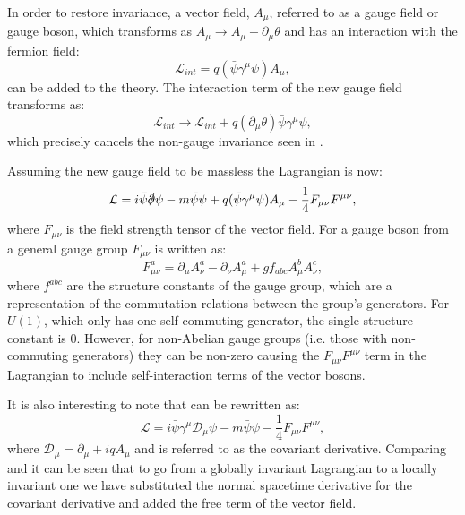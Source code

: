 In order to restore invariance, a vector field, $A_{\mu}$, referred to as a gauge field or gauge boson, which transforms as $A_{\mu}\rightarrow A_{\mu}+\partial_{\mu}\theta$ and has an interaction with the fermion field:
\begin{equation}
  \mathcal{L}_{int}=q(\bar{\psi}\gamma^{\mu}\psi) A_{\mu},
\end{equation}
 can be added to the theory. The interaction term of the new gauge field transforms as:
\begin{equation}
  \mathcal{L}_{int}\rightarrow \mathcal{L}_{int}+q(\partial_{\mu}\theta)\bar{\psi}\gamma^{\mu}\psi,
\end{equation}
which precisely cancels the non-gauge invariance seen in .

Assuming the new gauge field to be massless the Lagrangian is now:
\begin{equation}
  \label{eq:diraclag}
  \mathcal{L}=i\bar{\psi}\slashed{\partial}\psi-m\bar{\psi}\psi+q(\bar{\psi}\gamma^{\mu}\psi) A_{\mu}-\frac{1}{4}F_{\mu\nu}F^{\mu\nu},
\end{equation}
where $F_{\mu\nu}$ is the field strength tensor of the vector field. For a gauge boson from a general gauge group $F_{\mu\nu}$ is written as:
\begin{equation}
F_{\mu\nu}^a=\partial_{\mu}A_{\nu}^a-\partial_{\nu}A_{\mu}^a+gf_{abc}A_{\mu}^{b}A_{\nu}^{c},
\end{equation}
where $f^{abc}$ are the structure constants of the gauge group, which are a representation of the commutation relations between the group's generators. For $U(1)$, which only has one self-commuting generator, the single structure constant is 0. However, for non-Abelian gauge groups (i.e. those with non-commuting generators) they can be non-zero causing the $F_{\mu\nu}F^{\mu\nu}$ term in the Lagrangian to include self-interaction terms of the vector bosons.

It is also interesting to note that  can be rewritten as:
\begin{equation}
  \label{eq:localdiraclagrangian}
  \mathcal{L}=i\bar{\psi}\gamma^{\mu}\mathcal{D}_{\mu}\psi-m\bar{\psi}\psi-\frac{1}{4}F_{\mu\nu}F^{\mu\nu},
\end{equation}
where $\mathcal{D}_{\mu}=\partial_{\mu}+iqA_{\mu}$ and is referred to as the covariant derivative. Comparing  and  it can be seen that to go from a globally invariant Lagrangian to a locally invariant one we have substituted the normal spacetime derivative for the covariant derivative and added the free term of the vector field.

